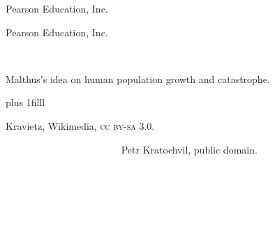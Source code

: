 \documentclass[t]{beamer}
\begin{document}
%
{
\begin{frame}[b]

\hfill\tiny\textcopyright Pearson Education, Inc.
\end{frame}
}
%
{
\begin{frame}[b]

\hfill\tiny\textcopyright Pearson Education, Inc.
\end{frame}
}
%
{
\begin{frame}[b]

\tiny\textcolor{white}{Wikimedia, public domain.}
\end{frame}
}
%
{
\begin{frame}[t]{Malthus's idea on human population growth and catastrophe.}

\vskip0pt plus 1filll

\hfill\tiny Kravietz, Wikimedia, \textsc{cc by-sa 3.0.}
\end{frame}
}
%
{
\begin{frame}[b]

\tiny\textcolor{white}{Wikimedia, public domain.}\hspace*{50mm}Petr Kratochvil, public domain.
\end{frame}
}
%
{
\begin{frame}[b]

\tiny\textcolor{white}{Wikimedia, public domain.}
\end{frame}
}
%
{
\begin{frame}[b]

\tiny\textcolor{white}{Wikimedia, public domain.}
\end{frame}
}
%
{
\begin{frame}[b]

\hfill\tiny\textcolor{white}{Wikimedia, public domain.}
\end{frame}
}
%
\end{document}
